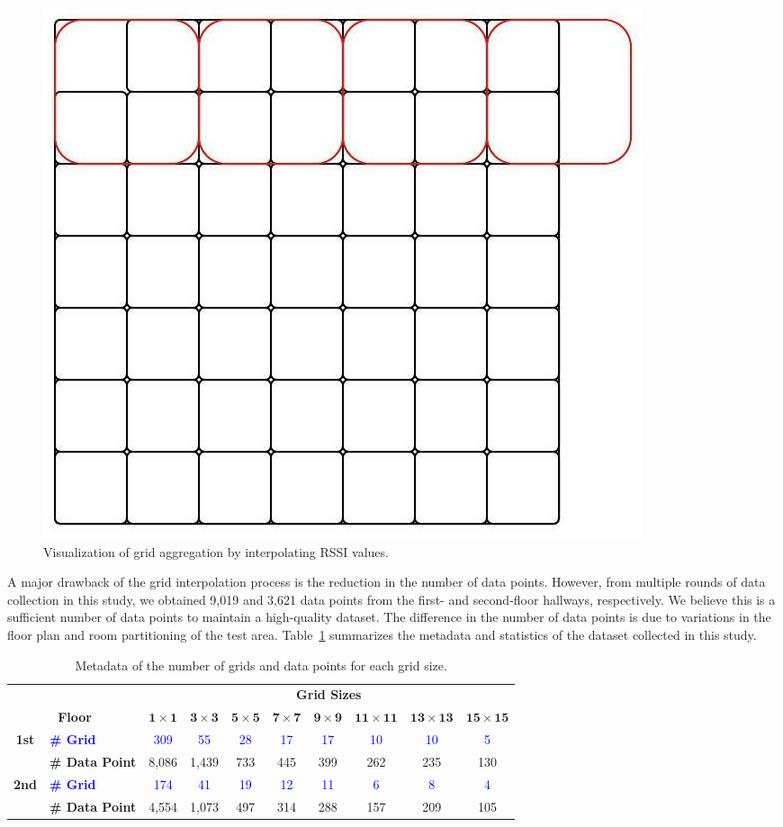 \documentclass[runningheads]{llncs}
\begin{document}
\begin{figure}[th!]
        \centering
        \includegraphics[width=.3\linewidth]{figures/image14.jpg}
        \caption{Visualization of grid aggregation by interpolating RSSI values.}
        \label{fig:vis-grid-aggr}
\end{figure}

A major drawback of the grid interpolation process is the reduction in the number of data points. However, from multiple rounds of data collection in this study, we obtained 9,019 and 3,621 data points from the first- and second-floor hallways, respectively. We believe this is a sufficient number of data points to maintain a high-quality dataset. The difference in the number of data points is due to variations in the floor plan and room partitioning of the test area. Table~\ref{tab:metadata} summarizes the metadata and statistics of the dataset collected in this study.

\begin{table}[th!]
        \caption{Metadata of the number of grids and data points for each grid size.}
        \label{tab:metadata}
        \centering
        \begin{tabular}{|c|l|c|c|c|c|c|c|c|c|}
                \hline
                \multicolumn{2}{|c|}{} & \multicolumn{8}{|c|}{\textbf{Grid Sizes}} \\
                \cline{3-10}
                \multicolumn{2}{|c|}{\textbf{Floor}} & $\mathbf{1\times1}$ & $\mathbf{3\times3}$ & $\mathbf{5\times5}$ & $\mathbf{7\times7}$ & $\mathbf{9\times9}$ & $\mathbf{11\times11}$ & $\mathbf{13\times13}$ & $\mathbf{15\times15}$ \\
                \hline
                \textbf{1st} & \textcolor{blue}{\textbf{\# Grid}} & \textcolor{blue}{309} & \textcolor{blue}{55} & \textcolor{blue}{28} & \textcolor{blue}{17} & \textcolor{blue}{17} & \textcolor{blue}{10} & \textcolor{blue}{10} & \textcolor{blue}{5} \\
                \cline{2-10}
                & \textbf{\# Data Point} & 8,086 & 1,439 & 733 & 445 & 399 & 262 & 235 & 130 \\
                \hline
                \textbf{2nd} & \textcolor{blue}{\textbf{\# Grid}} & \textcolor{blue}{174} & \textcolor{blue}{41} & \textcolor{blue}{19} & \textcolor{blue}{12} & \textcolor{blue}{11} & \textcolor{blue}{6} & \textcolor{blue}{8} & \textcolor{blue}{4} \\
                \cline{2-10}
                & \textbf{\# Data Point} & 4,554 & 1,073 & 497 & 314 & 288 & 157 & 209 & 105 \\
                \hline    
        \end{tabular}
\end{table}
\end{document}
